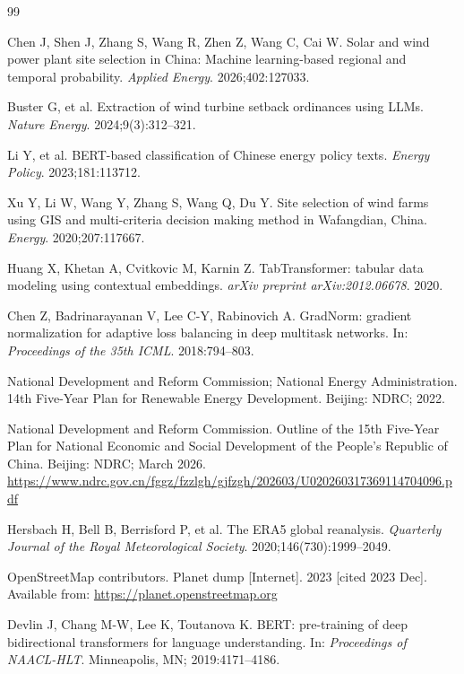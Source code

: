 \documentclass[12pt, a4paper]{article}
\begin{document}
\begin{thebibliography}{99}

Chen J, Shen J, Zhang S, Wang R, Zhen Z,
Wang C, Cai W.
Solar and wind power plant site selection in China:
Machine learning-based regional and temporal probability.
\textit{Applied Energy}.
2026;402:127033.

Buster G, et al.
Extraction of wind turbine setback ordinances using LLMs.
\textit{Nature Energy}.
2024;9(3):312--321.

Li Y, et al.
BERT-based classification of Chinese energy policy texts.
\textit{Energy Policy}.
2023;181:113712.

Xu Y, Li W, Wang Y, Zhang S, Wang Q,
Du Y.
Site selection of wind farms using GIS and multi-criteria
decision making method in Wafangdian, China.
\textit{Energy}.
2020;207:117667.

Huang X, Khetan A, Cvitkovic M, Karnin Z.
TabTransformer: tabular data modeling using contextual embeddings.
\textit{arXiv preprint arXiv:2012.06678}.
2020.

Chen Z, Badrinarayanan V, Lee C-Y, Rabinovich A.
GradNorm: gradient normalization for adaptive loss balancing
in deep multitask networks.
In: \textit{Proceedings of the 35th ICML}.
2018:794--803.

National Development and Reform Commission; National Energy Administration.
14th Five-Year Plan for Renewable Energy Development.
Beijing: NDRC; 2022.

National Development and Reform Commission.
Outline of the 15th Five-Year Plan for National Economic and Social Development
of the People's Republic of China.
Beijing: NDRC; March 2026.
\url{https://www.ndrc.gov.cn/fggz/fzzlgh/gjfzgh/202603/U020260317369114704096.pdf}

Hersbach H, Bell B, Berrisford P, et al.
The ERA5 global reanalysis.
\textit{Quarterly Journal of the Royal Meteorological Society}.
2020;146(730):1999--2049.

OpenStreetMap contributors.
Planet dump [Internet].
2023 [cited 2023 Dec].
Available from: \url{https://planet.openstreetmap.org}

Devlin J, Chang M-W, Lee K, Toutanova K.
BERT: pre-training of deep bidirectional transformers for
language understanding.
In: \textit{Proceedings of NAACL-HLT}.
Minneapolis, MN; 2019:4171--4186.


\end{thebibliography}
\end{document}
